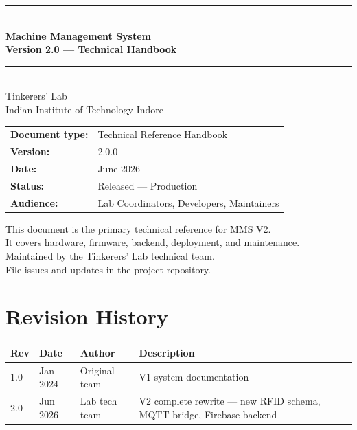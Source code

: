 \documentclass[12pt,a4paper,twoside]{report}
\begin{document}

\begin{titlepage}
\centering
\vspace*{2cm}
{\color{mmsdark}\rule{\linewidth}{2pt}}\\[0.5cm]
{\color{mmsdark}\Huge\bfseries Machine Management System\\[0.3cm]
\LARGE Version 2.0 — Technical Handbook}\\[0.5cm]
{\color{mmsdark}\rule{\linewidth}{2pt}}\\[1.5cm]
{\Large\color{mmsgray} Tinkerers' Lab \\ Indian Institute of Technology Indore}\\[2cm]

\begin{tabular}{ll}
\textbf{Document type:} & Technical Reference Handbook \\[4pt]
\textbf{Version:}       & 2.0.0 \\[4pt]
\textbf{Date:}          & June 2026 \\[4pt]
\textbf{Status:}        & Released — Production \\[4pt]
\textbf{Audience:}      & Lab Coordinators, Developers, Maintainers \\[4pt]
\end{tabular}

\vfill
{\color{mmsgray}\small
This document is the primary technical reference for MMS V2.\\
It covers hardware, firmware, backend, deployment, and maintenance.\\[0.5cm]
Maintained by the Tinkerers' Lab technical team. \\
File issues and updates in the project repository.
}
\end{titlepage}

\chapter*{Revision History}
\begin{longtable}{L{1.5cm}L{2.5cm}L{3cm}L{7cm}}
\toprule
\textbf{Rev} & \textbf{Date} & \textbf{Author} & \textbf{Description} \\
 & Jan 2024 & Original team & V1 system documentation \\
2.0 & Jun 2026 & Lab tech team & V2 complete rewrite — new RFID schema, MQTT bridge, Firebase backend \\
\bottomrule
\end{longtable}
\end{document}
